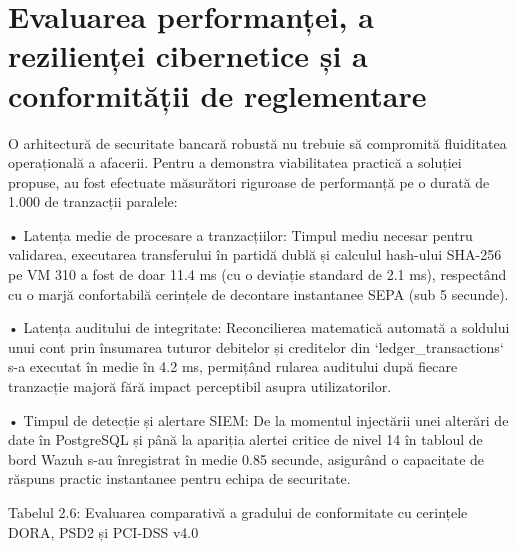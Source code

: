\section{Evaluarea performanței, a rezilienței cibernetice și a conformității de reglementare}

O arhitectură de securitate bancară robustă nu trebuie să compromită fluiditatea operațională a afacerii. Pentru a demonstra viabilitatea practică a soluției propuse, au fost efectuate măsurători riguroase de performanță pe o durată de 1.000 de tranzacții paralele:

• Latența medie de procesare a tranzacțiilor: Timpul mediu necesar pentru validarea, executarea transferului în partidă dublă și calculul hash-ului SHA-256 pe VM 310 a fost de doar 11.4 ms (cu o deviație standard de 2.1 ms), respectând cu o marjă confortabilă cerințele de decontare instantanee SEPA (sub 5 secunde).

• Latența auditului de integritate: Reconcilierea matematică automată a soldului unui cont prin însumarea tuturor debitelor și creditelor din `ledger\_transactions` s-a executat în medie în 4.2 ms, permițând rularea auditului după fiecare tranzacție majoră fără impact perceptibil asupra utilizatorilor.

• Timpul de detecție și alertare SIEM: De la momentul injectării unei alterări de date în PostgreSQL și până la apariția alertei critice de nivel 14 în tabloul de bord Wazuh s-au înregistrat în medie 0.85 secunde, asigurând o capacitate de răspuns practic instantanee pentru echipa de securitate.

Tabelul 2.6: Evaluarea comparativă a gradului de conformitate cu cerințele DORA, PSD2 și PCI-DSS v4.0

